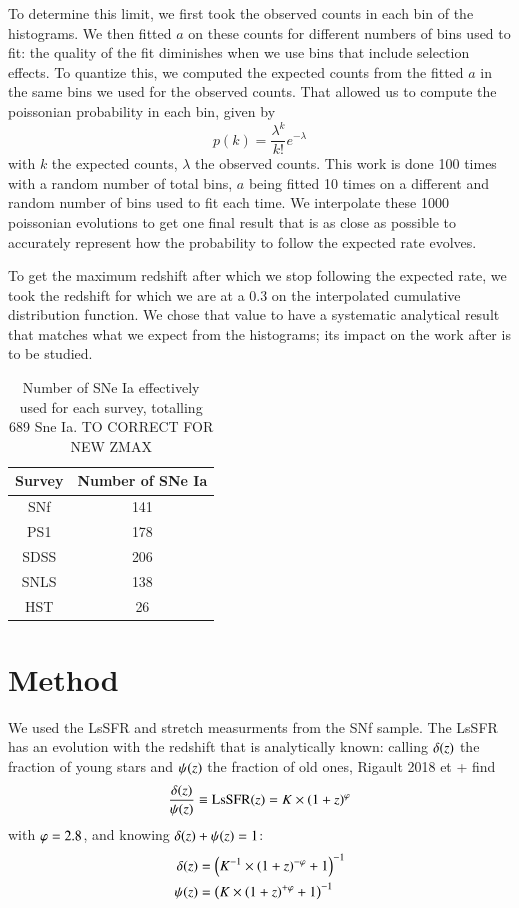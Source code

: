 \documentclass{aa}
\def\l{\lambda}\def\L{\Lambda}
\begin{document}
To determine this limit, we first took the observed counts in each bin of the
histograms. We then fitted $a$ on these counts for different numbers of bins
used to fit: the quality of the fit diminishes when we use bins that include
selection effects. To quantize this, we computed the expected counts from the
fitted $a$ in the same bins we used for the observed counts. That allowed us to
compute the poissonian probability in each bin, given by
\begin{equation}
    p(k) = \frac{\l^k}{k!}e^{-\l}
\end{equation}
with $k$ the expected counts, $\l$ the observed counts. This work is done 100
times with a random number of total bins, $a$ being fitted 10 times on a
different and random number of bins used to fit each time. We interpolate these
1000 poissonian evolutions to get one final result that is as close as possible
to accurately represent how the probability to follow the expected rate evolves.

To get the maximum redshift after which we stop following the expected rate, we
took the redshift for which we are at a 0.3 on the interpolated cumulative
distribution function. We chose that value to have a systematic analytical
result that matches what we expect from the histograms; its impact on the work
after is to be studied.

\begin{table}[htbp!]
    \centering
    \caption{Number of SNe Ia effectively used for each survey, totalling 689
    Sne Ia. TO CORRECT FOR NEW ZMAX}
    \label{tab:sample}
    \begin{tabular}{c c}\hline
        \rowcolor{gray!15} Survey & Number of SNe Ia \\\hline
        SNf & 141 \\
        PS1 & 178 \\
        SDSS & 206 \\
        SNLS & 138 \\
        HST & 26 \\\hline
    \end{tabular}
\end{table}


\section{Method}

We used the LsSFR and stretch measurments from the SNf sample. The LsSFR has an
evolution with the redshift that is analytically known: calling $\delta(z)$ the
fraction of young stars and $\psi(z)$ the fraction of old ones, Rigault 2018 et +
find
\begin{equation}
    \frac{\delta(z)}{\psi(z)} \equiv \mathrm{LsSFR}(z) = K\times \left(1+z\right)^\varphi
\end{equation}
with $\varphi = 2.8$, and knowing $\delta(z) + \psi(z) = 1$:
\begin{align}
    \delta(z) & = \left(K^{-1}\times \left(1+z\right)^{-\varphi} +1\right)^{-1}\\
    \psi(z) & = \left(K\times \left(1+z\right)^{+\varphi} + 1\right)^{-1}
\end{align}
\end{document}
